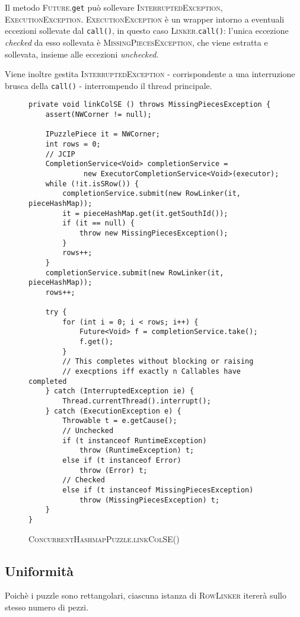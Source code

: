 \documentclass[a4paper]{article}
\newcommand{\Classname}[1]{\textsc{#1}}
\newcommand{\Methodname}[1]{\texttt{#1}}
\begin{document}
Il metodo \Classname{Future}.\Methodname{get} pu\`o sollevare \Classname{InterruptedException}, \Classname{ExecutionException}.
\Classname{ExecutionException} \`e un wrapper intorno a eventuali eccezioni sollevate dal \Methodname{call()}, in questo caso \Classname{Linker}.\Methodname{call()}: l'unica eccezione \emph{checked} da esso sollevata \`e \Classname{MissingPiecesException}, che viene estratta e sollevata, insieme alle eccezioni \emph{unchecked}.

Viene inoltre gestita \Classname{InterruptedException} - corrispondente a una interruzione brusca della \Methodname{call()} - interrompendo il thread principale.

\begin{figure}[h!]
  \centering
\label{linkcol}
\begin{lstlisting}[frame=single]
private void linkColSE () throws MissingPiecesException {
	assert(NWCorner != null);
	
	IPuzzlePiece it = NWCorner;
	int rows = 0;
	// JCIP
	CompletionService<Void> completionService = 
             new ExecutorCompletionService<Void>(executor);
	while (!it.isSRow()) {
		completionService.submit(new RowLinker(it, pieceHashMap));
		it = pieceHashMap.get(it.getSouthId());
		if (it == null) {
			throw new MissingPiecesException();
		}
		rows++;
	}
	completionService.submit(new RowLinker(it, pieceHashMap));
	rows++;

	try {
		for (int i = 0; i < rows; i++) {
			Future<Void> f = completionService.take();
			f.get();
		}
		// This completes without blocking or raising
		// execptions iff exactly n Callables have completed
	} catch (InterruptedException ie) {
		Thread.currentThread().interrupt();
	} catch (ExecutionException e) {
		Throwable t = e.getCause();
		// Unchecked
		if (t instanceof RuntimeException) 
			throw (RuntimeException) t;
		else if (t instanceof Error)
			throw (Error) t;
		// Checked
		else if (t instanceof MissingPiecesException)
			throw (MissingPiecesException) t;
	}
}
\end{lstlisting}
\caption {\textsc{ConcurrentHashmapPuzzle.linkColSE()}}
\end{figure}


\subsection{Uniformit\`a}
Poich\`e i puzzle sono rettangolari, ciascuna istanza di \Classname{RowLinker} iterer\`a sullo stesso numero di pezzi.
\end{document}
